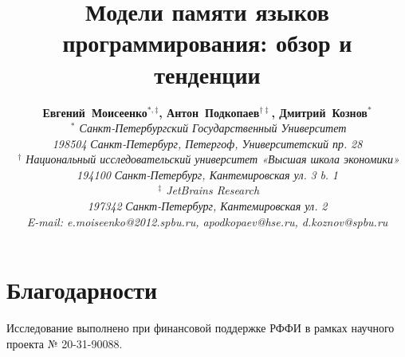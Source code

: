 \documentclass[a4paper,twoside,11pt]{article}
\author{
{\bfseries Евгений~Моисеенко$^{*, \ddagger}$, Антон~Подкопаев$^{\dagger \ddagger}$, Дмитрий~Кознов$^{*}$}
\\ {\itshape $~^{*}$ Санкт-Петербургский Государственный Университет}
\\ {\slshape 198504} {\itshape Санкт-Петербург, Петергоф, Университетский пр.} {\slshape 28}
\\ {\itshape $~^{\dagger}$ Национальный исследовательский университет «Высшая школа экономики»}
\\ {\slshape 194100} {\itshape Санкт-Петербург, Кантемировская ул.} {\slshape 3} {\itshape b.} {\slshape 1}
\\ {\itshape $~^{\ddagger}$ JetBrains Research}
\\ {\slshape 197342} {\itshape Санкт-Петербург, Кантемировская ул.} {\slshape 2}
\\ {\itshape E-mail: e.moiseenko@2012.spbu.ru, apodkopaev@hse.ru, d.koznov@spbu.ru}}
\title{Модели памяти языков программирования: обзор и тенденции}
\date{}
\numberwithin{equation}{section}
\begin{document}
\maketitle











\section*{Благодарности}

Исследование выполнено при финансовой поддержке РФФИ в рамках научного проекта № 20-31-90088. \\

 
%  




\clearpage
\appendix

% 
\end{document}
